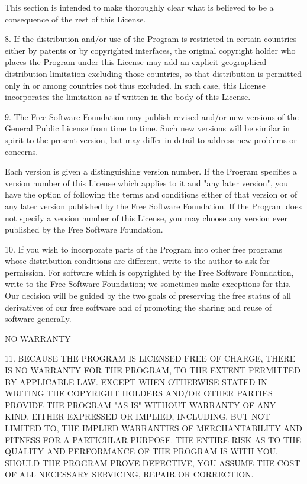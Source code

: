 This section is intended to make thoroughly clear what is believed to
be a consequence of the rest of this License.

8. If the distribution and/or use of the Program is restricted in
certain countries either by patents or by copyrighted interfaces, the
original copyright holder who places the Program under this License
may add an explicit geographical distribution limitation excluding
those countries, so that distribution is permitted only in or among
countries not thus excluded.  In such case, this License incorporates
the limitation as if written in the body of this License.

9. The Free Software Foundation may publish revised and/or new versions
of the General Public License from time to time.  Such new versions will
be similar in spirit to the present version, but may differ in detail to
address new problems or concerns.

Each version is given a distinguishing version number.  If the Program
specifies a version number of this License which applies to it and "any
later version", you have the option of following the terms and conditions
either of that version or of any later version published by the Free
Software Foundation.  If the Program does not specify a version number of
this License, you may choose any version ever published by the Free Software
Foundation.

10. If you wish to incorporate parts of the Program into other free
programs whose distribution conditions are different, write to the author
to ask for permission.  For software which is copyrighted by the Free
Software Foundation, write to the Free Software Foundation; we sometimes
make exceptions for this.  Our decision will be guided by the two goals
of preserving the free status of all derivatives of our free software and
of promoting the sharing and reuse of software generally.

NO WARRANTY

11. BECAUSE THE PROGRAM IS LICENSED FREE OF CHARGE, THERE IS NO WARRANTY
FOR THE PROGRAM, TO THE EXTENT PERMITTED BY APPLICABLE LAW.  EXCEPT WHEN
OTHERWISE STATED IN WRITING THE COPYRIGHT HOLDERS AND/OR OTHER PARTIES
PROVIDE THE PROGRAM "AS IS" WITHOUT WARRANTY OF ANY KIND, EITHER EXPRESSED
OR IMPLIED, INCLUDING, BUT NOT LIMITED TO, THE IMPLIED WARRANTIES OF
MERCHANTABILITY AND FITNESS FOR A PARTICULAR PURPOSE.  THE ENTIRE RISK AS
TO THE QUALITY AND PERFORMANCE OF THE PROGRAM IS WITH YOU.  SHOULD THE
PROGRAM PROVE DEFECTIVE, YOU ASSUME THE COST OF ALL NECESSARY SERVICING,
REPAIR OR CORRECTION.

